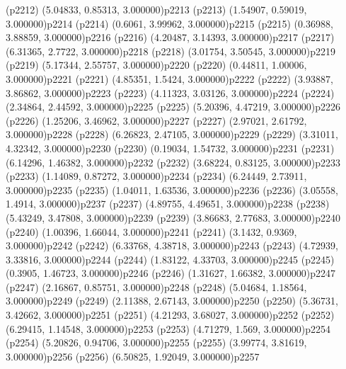 \psdot(p2212)
\psPoint(5.04833, 0.85313, 3.000000){p2213}
\psdot(p2213)
\psPoint(1.54907, 0.59019, 3.000000){p2214}
\psdot(p2214)
\psPoint(0.6061, 3.99962, 3.000000){p2215}
\psdot(p2215)
\psPoint(0.36988, 3.88859, 3.000000){p2216}
\psdot(p2216)
\psPoint(4.20487, 3.14393, 3.000000){p2217}
\psdot(p2217)
\psPoint(6.31365, 2.7722, 3.000000){p2218}
\psdot(p2218)
\psPoint(3.01754, 3.50545, 3.000000){p2219}
\psdot(p2219)
\psPoint(5.17344, 2.55757, 3.000000){p2220}
\psdot(p2220)
\psPoint(0.44811, 1.00006, 3.000000){p2221}
\psdot(p2221)
\psPoint(4.85351, 1.5424, 3.000000){p2222}
\psdot(p2222)
\psPoint(3.93887, 3.86862, 3.000000){p2223}
\psdot(p2223)
\psPoint(4.11323, 3.03126, 3.000000){p2224}
\psdot(p2224)
\psPoint(2.34864, 2.44592, 3.000000){p2225}
\psdot(p2225)
\psPoint(5.20396, 4.47219, 3.000000){p2226}
\psdot(p2226)
\psPoint(1.25206, 3.46962, 3.000000){p2227}
\psdot(p2227)
\psPoint(2.97021, 2.61792, 3.000000){p2228}
\psdot(p2228)
\psPoint(6.26823, 2.47105, 3.000000){p2229}
\psdot(p2229)
\psPoint(3.31011, 4.32342, 3.000000){p2230}
\psdot(p2230)
\psPoint(0.19034, 1.54732, 3.000000){p2231}
\psdot(p2231)
\psPoint(6.14296, 1.46382, 3.000000){p2232}
\psdot(p2232)
\psPoint(3.68224, 0.83125, 3.000000){p2233}
\psdot(p2233)
\psPoint(1.14089, 0.87272, 3.000000){p2234}
\psdot(p2234)
\psPoint(6.24449, 2.73911, 3.000000){p2235}
\psdot(p2235)
\psPoint(1.04011, 1.63536, 3.000000){p2236}
\psdot(p2236)
\psPoint(3.05558, 1.4914, 3.000000){p2237}
\psdot(p2237)
\psPoint(4.89755, 4.49651, 3.000000){p2238}
\psdot(p2238)
\psPoint(5.43249, 3.47808, 3.000000){p2239}
\psdot(p2239)
\psPoint(3.86683, 2.77683, 3.000000){p2240}
\psdot(p2240)
\psPoint(1.00396, 1.66044, 3.000000){p2241}
\psdot(p2241)
\psPoint(3.1432, 0.9369, 3.000000){p2242}
\psdot(p2242)
\psPoint(6.33768, 4.38718, 3.000000){p2243}
\psdot(p2243)
\psPoint(4.72939, 3.33816, 3.000000){p2244}
\psdot(p2244)
\psPoint(1.83122, 4.33703, 3.000000){p2245}
\psdot(p2245)
\psPoint(0.3905, 1.46723, 3.000000){p2246}
\psdot(p2246)
\psPoint(1.31627, 1.66382, 3.000000){p2247}
\psdot(p2247)
\psPoint(2.16867, 0.85751, 3.000000){p2248}
\psdot(p2248)
\psPoint(5.04684, 1.18564, 3.000000){p2249}
\psdot(p2249)
\psPoint(2.11388, 2.67143, 3.000000){p2250}
\psdot(p2250)
\psPoint(5.36731, 3.42662, 3.000000){p2251}
\psdot(p2251)
\psPoint(4.21293, 3.68027, 3.000000){p2252}
\psdot(p2252)
\psPoint(6.29415, 1.14548, 3.000000){p2253}
\psdot(p2253)
\psPoint(4.71279, 1.569, 3.000000){p2254}
\psdot(p2254)
\psPoint(5.20826, 0.94706, 3.000000){p2255}
\psdot(p2255)
\psPoint(3.99774, 3.81619, 3.000000){p2256}
\psdot(p2256)
\psPoint(6.50825, 1.92049, 3.000000){p2257}
